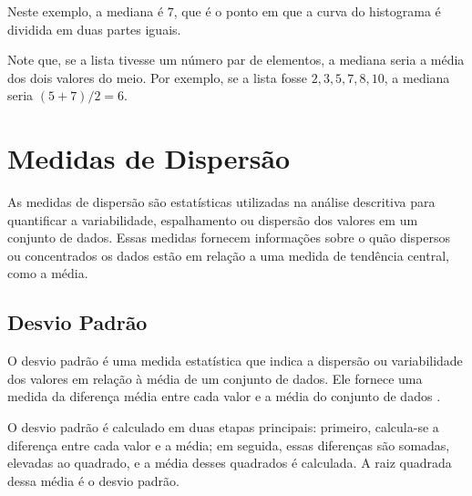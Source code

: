 \begin{center}
\end{center}
    
    

Neste exemplo, a mediana é $7$, que é o ponto em que a curva do histograma é dividida em duas partes iguais.

Note que, se a lista tivesse um número par de elementos, a mediana seria a média dos dois valores do meio. Por exemplo, se a lista fosse $2, 3, 5, 7, 8, 10$, a mediana seria $(5+7)/2 = 6$.

\section{Medidas de Dispersão}

As medidas de dispersão são estatísticas utilizadas na análise descritiva para quantificar a variabilidade, espalhamento ou dispersão dos valores em um conjunto de dados. Essas medidas fornecem informações sobre o quão dispersos ou concentrados os dados estão em relação a uma medida de tendência central, como a média.

\subsection{Desvio Padrão}

O desvio padrão é uma medida estatística que indica a dispersão ou variabilidade dos valores em relação à média de um conjunto de dados. Ele fornece uma medida da diferença média entre cada valor e a média do conjunto de dados \parencite{Triola2017}.

O desvio padrão é calculado em duas etapas principais: primeiro, calcula-se a diferença entre cada valor e a média; em seguida, essas diferenças são somadas, elevadas ao quadrado, e a média desses quadrados é calculada. A raiz quadrada dessa média é o desvio padrão.

